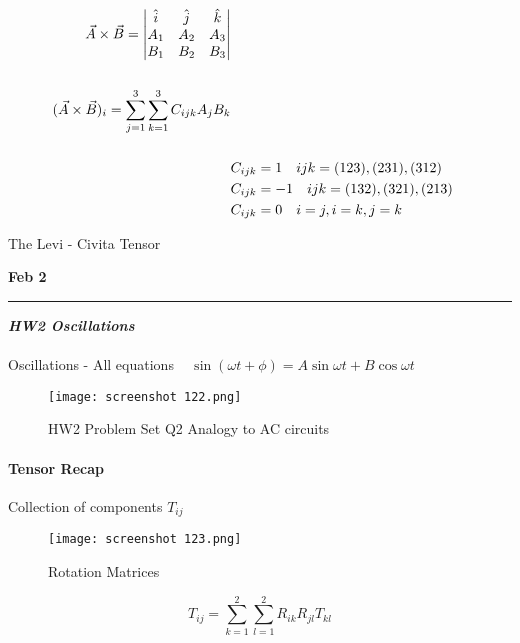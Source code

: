 \documentclass[svgnames]{article}   	%
\begin{document}
\begin{align*}
  \vec{A} \times \vec{B} = \begin{vmatrix} 
    \hat{i} & \hat{j} & \hat{k} \\
  A_1 & A_2 & A_3 \\
  B_1 & B_2 & B_3 
  \end{vmatrix} \\\\
  (\vec{A} \times \vec{B})_i = \sum_{j=1}^3\sum_{k=1}^3 C_{ijk} A_j B_k \\\\
  &C_{ijk} = 1 \hspace{10px} ijk = (123), (231), (312) \\
  &C_{ijk} = -1 \hspace{10px} ijk = (132), (321), (213) \\
  &C_{ijk} = 0 \hspace{10px} i = j, i = k, j = k
\end{align*}

The Levi - Civita Tensor


\newpage
\noindent \textbf{Feb 2} \hrule
\vspace{10px}
\textit{ \textbf{HW2 Oscillations}} 
\mbox{}\\\\
Oscillations - All equations ~ $\sin (\omega t + \phi) = A \sin \omega
t + B\cos \omega t$ 

\begin{figure}[H]
  \centering
    \texttt{[image: screenshot 122.png]}
    \caption{HW2 Problem Set Q2 Analogy to AC circuits}
\end{figure}




\paragraph{Tensor Recap} 

Collection of components $T_{ij}$ 

\begin{figure}[H]
  \centering
    \texttt{[image: screenshot 123.png]}
    \caption{Rotation Matrices}
\end{figure}



\begin{tcolorbox}[colback = red!5!white, colframe = red!50!black, title
  = Transformation Theory]
  
  \[
    T_{ij} = \sum_{k=1}^{2} \sum_{l=1}^{2} R_{ik}R_{jl}T_{kl}
  \]
  
  

\end{tcolorbox}
\end{document}
